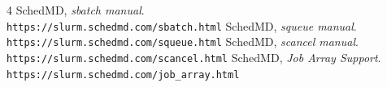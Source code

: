 \documentclass[11pt,letterpaper]{article}
\begin{document}
\begin{small}
\begin{thebibliography}{4}
\setlength{\itemsep}{2pt}
\setlength{\parsep}{0pt}
 SchedMD, \emph{sbatch manual}.\\
\texttt{https://slurm.schedmd.com/sbatch.html}
 SchedMD, \emph{squeue manual}.\\
\texttt{https://slurm.schedmd.com/squeue.html}
 SchedMD, \emph{scancel manual}.\\
\texttt{https://slurm.schedmd.com/scancel.html}
 SchedMD, \emph{Job Array Support}.\\
\verb|https://slurm.schedmd.com/job_array.html|
\end{thebibliography}
\end{small}
\end{document}
